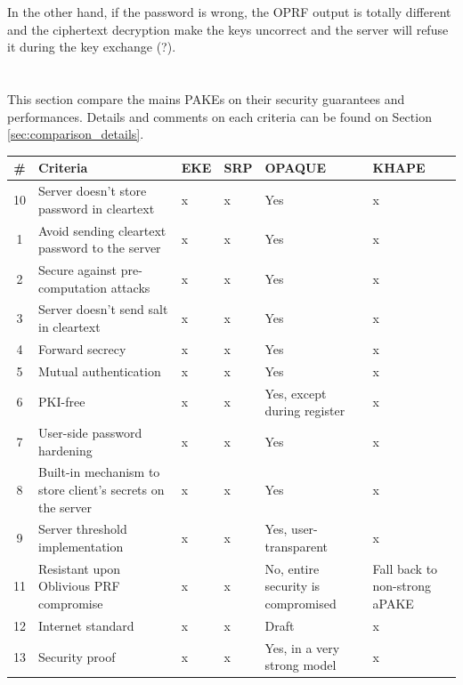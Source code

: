 \documentclass[../report.tex]{subfiles}
\begin{document}
In the other hand, if the password is wrong, the OPRF output is totally different and the ciphertext decryption make the keys uncorrect and the server will refuse it during the key exchange (?). %




\section{}

This section compare the mains PAKEs on their security guarantees and performances. Details and comments on each criteria can be found on Section \ref{sec:comparison_details}.

\begin{center}
   \begin{tabular}{ | c | p{8cm} || p{1cm} | p{1cm} | p{2cm} | p{2cm} | }
     \hline
     \textbf{\#} & \textbf{Criteria} & \textbf{EKE} & \textbf{SRP} & \textbf{OPAQUE} & \textbf{KHAPE} \\ \hline
     
     
     
     10 & Server doesn't store password in cleartext & x & x & Yes & x \\ \hline
     1 & Avoid sending cleartext password to the server & x & x & Yes & x \\ \hline
     2 & Secure against pre-computation attacks & x & x & Yes & x \\ \hline
     3 & Server doesn't send salt in cleartext & x & x & Yes & x \\ \hline
     4 & Forward secrecy & x & x & Yes & x \\ \hline
     5 & Mutual authentication & x & x & Yes & x \\ \hline
     6 & PKI-free & x & x & Yes, except during register & x \\ \hline
     7 & User-side password hardening & x & x & Yes & x \\ \hline
     8 & Built-in mechanism to store client's secrets on the server & x & x & Yes & x \\ \hline
     9 & Server threshold implementation & x & x & Yes, user-transparent & x \\ \hline
     11 & Resistant upon Oblivious PRF compromise & x & x & No, entire security is compromised & Fall back to non-strong aPAKE \\ \hline
     12 & Internet standard & x & x & Draft & x \\ \hline
     13 & Security proof & x & x & Yes, in a very strong model & x \\ \hline
     

\end{tabular}
\end{center}
\end{document}
